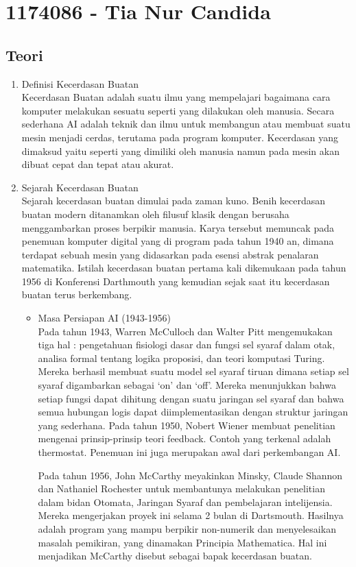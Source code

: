 \section{1174086 - Tia Nur Candida}

\subsection{Teori}
\begin{enumerate}
\item Definisi Kecerdasan Buatan\\
Kecerdasan Buatan adalah suatu ilmu yang mempelajari bagaimana cara komputer melakukan sesuatu seperti yang dilakukan oleh manusia. Secara sederhana AI adalah teknik dan ilmu untuk membangun atau membuat suatu mesin menjadi cerdas, terutama pada program komputer. Kecerdasan yang dimaksud yaitu seperti yang dimiliki oleh manusia namun pada mesin akan dibuat cepat dan tepat atau akurat.

\item Sejarah Kecerdasan Buatan\\
Sejarah kecerdasan buatan dimulai pada zaman kuno. Benih kecerdasan buatan modern ditanamkan oleh filusuf klasik dengan berusaha menggambarkan proses berpikir manusia. Karya tersebut memuncak pada penemuan komputer digital yang di program pada tahun 1940 an, dimana terdapat sebuah mesin yang didasarkan pada esensi abstrak penalaran matematika. 
Istilah kecerdasan buatan pertama kali dikemukaan pada tahun 1956 di Konferensi Darthmouth yang kemudian sejak saat itu kecerdasan buatan terus berkembang.

\begin{itemize}
\item Masa Persiapan AI (1943-1956)\\
Pada tahun 1943, Warren McCulloch dan Walter Pitt mengemukakan tiga hal : pengetahuan fisiologi dasar dan fungsi sel syaraf dalam otak, analisa formal tentang logika proposisi, dan teori komputasi Turing. Mereka berhasil membuat suatu model sel syaraf tiruan dimana setiap sel syaraf digambarkan sebagai ‘on’ dan ‘off’. Mereka menunjukkan bahwa setiap fungsi dapat dihitung dengan suatu jaringan sel syaraf dan bahwa semua hubungan logis dapat diimplementasikan dengan struktur jaringan yang sederhana.
Pada tahun 1950, Nobert Wiener membuat penelitian mengenai prinsip-prinsip teori feedback. Contoh yang terkenal adalah thermostat. Penemuan ini juga merupakan awal dari perkembangan AI.

Pada tahun 1956, John McCarthy meyakinkan Minsky, Claude Shannon dan Nathaniel Rochester untuk membantunya melakukan penelitian dalam bidan Otomata, Jaringan Syaraf dan pembelajaran intelijensia. Mereka mengerjakan proyek ini selama 2 bulan di Dartsmouth. Hasilnya adalah program yang mampu berpikir non-numerik dan menyelesaikan masalah pemikiran, yang dinamakan Principia Mathematica. Hal ini menjadikan McCarthy disebut sebagai bapak kecerdasan buatan.



\end{itemize}
\end{enumerate}

